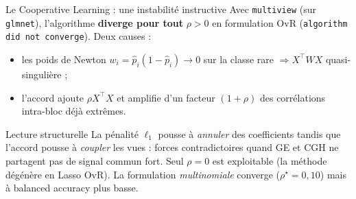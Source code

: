 \documentclass[aspectratio=169, 10pt]{beamer}
\begin{document}
\begin{frame}{Le Cooperative Learning : une instabilité instructive}
  Avec \texttt{multiview} (sur \texttt{glmnet}), l’algorithme \textbf{diverge pour tout} $\rho > 0$ en formulation OvR (\texttt{algorithm did not converge}). Deux causes :
  \begin{itemize}
    \item les poids de Newton $w_i = \hat{p}_i(1 - \hat{p}_i) \to 0$ sur la classe rare $\Rightarrow X^\top W X$ quasi-singulière ;
    \item l’accord ajoute $\rho X^\top X$ et amplifie d’un facteur $(1 + \rho)$ des corrélations intra-bloc déjà extrêmes.
  \end{itemize}

  \bigskip
  \begin{block}{Lecture structurelle}
    La pénalité $\ell_1$ pousse à \textit{annuler} des coefficients tandis que l’accord pousse à \textit{coupler} les vues : forces contradictoires quand GE et CGH ne partagent pas de signal commun fort. Seul $\rho = 0$ est exploitable (la méthode dégénère en Lasso OvR). La formulation \textit{multinomiale} converge ($\rho^\star = 0{,}10$) mais à balanced accuracy plus basse.
  \end{block}
\end{frame}
\end{document}
